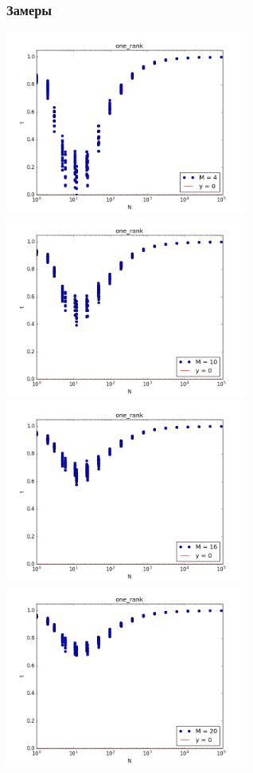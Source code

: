 \subsubsection{Замеры}
\begin{center}
\includegraphics[width = 8cm]{pic/one_rank_m=4}
\includegraphics[width = 8cm]{pic/one_rank_m=10}
\includegraphics[width = 8cm]{pic/one_rank_m=16}
\includegraphics[width = 8cm]{pic/one_rank_m=20}
\end{center}

